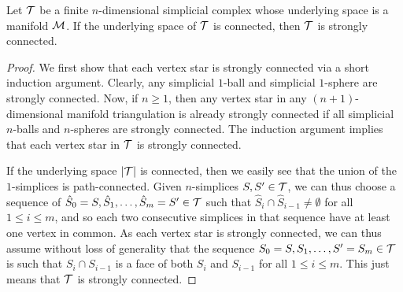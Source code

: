 \documentclass[10pt,letterpaper]{article}
\begin{document}
\begin{lemma}\label{lemma:connectivity}
    Let ${\mathcal T}$ be a finite $n$-dimensional simplicial complex whose underlying space is a manifold ${\mathcal M}$.
    If the underlying space of ${\mathcal T}$ is connected, then ${\mathcal T}$ is strongly connected.
\end{lemma}
\begin{proof}
    We first show that each vertex star is strongly connected via a short induction argument.
    Clearly, any simplicial $1$-ball and simplicial $1$-sphere are strongly connected. 
    Now, if $n \geq 1$, then any vertex star in any $(n+1)$-dimensional manifold triangulation is already strongly connected if all simplicial $n$-balls and $n$-spheres are strongly connected.
    The induction argument implies that each vertex star in ${\mathcal T}$ is strongly connected.

    If the underlying space $\left| {\mathcal T} \right|$ is connected, 
    then we easily see that the union of the $1$-simplices is path-connected.
    Given $n$-simplices $S,S' \in {\mathcal T}$, 
    we can thus choose a sequence of $\hat S_0=S,\hat S_1,\dots,\hat S_m=S' \in {\mathcal T}$ such that $\hat S_{i} \cap \hat S_{i-1} \neq \emptyset$ for all $1 \leq i \leq m$, and so each two consecutive simplices in that sequence have at least one vertex in common. 
    As each vertex star is strongly connected, 
    we can thus assume without loss of generality that the sequence $S_0=S,S_1,\dots,S'=S_m \in {\mathcal T}$ 
    is such that $S_{i} \cap S_{i-1}$ is a face of both $S_{i}$ and $S_{i-1}$ for all $1 \leq i \leq m$.
    This just means that ${\mathcal T}$ is strongly connected. 
\end{proof}
\end{document}
